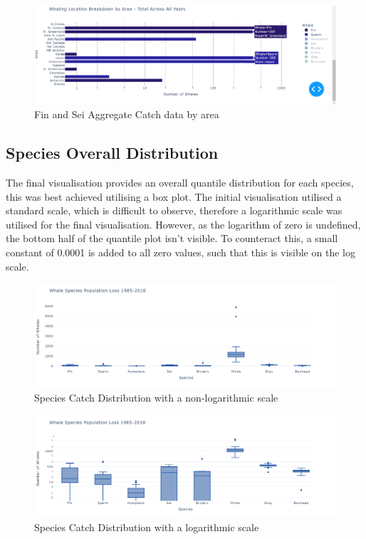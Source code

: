 \documentclass[12pt,a4paper]{article}
\begin{document}
\begin{figure}[H]
    \centering
    \includegraphics[width = 15cm]{Fin+SeiAreaGraph.png}
    \caption{Fin and Sei Aggregate Catch data by area}
    \label{fig:my_label}
\end{figure}


\subsection{Species Overall Distribution}
The final visualisation provides an overall quantile distribution for each species, this was best achieved utilising a box plot. The initial visualisation utilised a standard scale, which is difficult to observe, therefore a logarithmic scale was utilised for the final visualisation. However, as the logarithm of zero is undefined, the bottom half of the quantile plot isn't visible. To counteract this, a small constant of 0.0001 is added to all zero values, such that this is visible on the log scale. 

\begin{figure}[H]
    \centering
    \includegraphics[width = 15cm]{boxFnoLog.png}
    \caption{Species Catch Distribution with a non-logarithmic scale}
    \label{fig:my_label}
\end{figure}

\begin{figure}[H]
    \centering
    \includegraphics[width = 15cm]{boxFlog.png}
    \caption{Species Catch Distribution with a logarithmic scale}
    \label{fig:my_label}
\end{figure}
\end{document}
